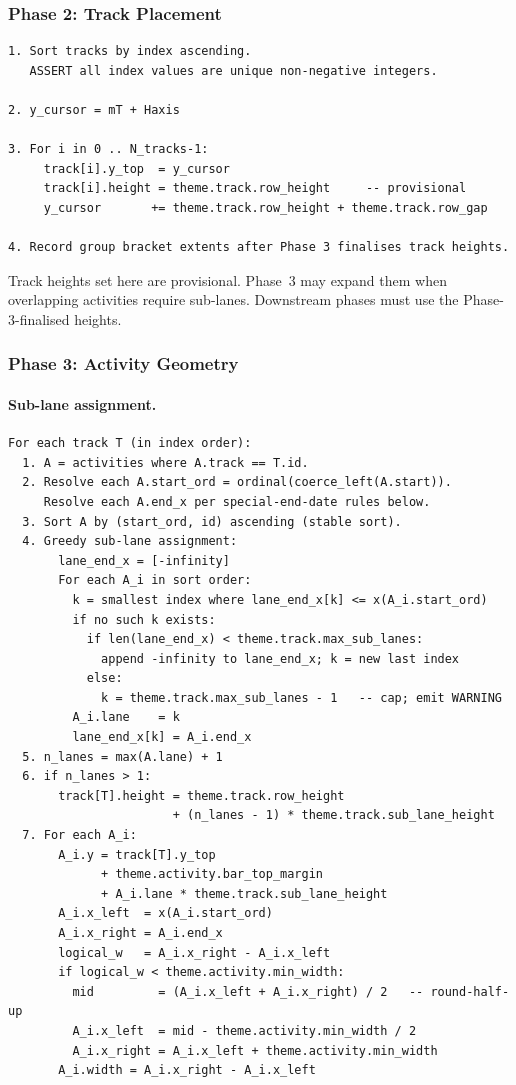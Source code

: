 \subsubsection{Phase 2: Track Placement}
\label{sec:phase2}

\begin{lstlisting}[caption={Phase 2: Track placement}]
1. Sort tracks by index ascending.
   ASSERT all index values are unique non-negative integers.

2. y_cursor = mT + Haxis

3. For i in 0 .. N_tracks-1:
     track[i].y_top  = y_cursor
     track[i].height = theme.track.row_height     -- provisional
     y_cursor       += theme.track.row_height + theme.track.row_gap

4. Record group bracket extents after Phase 3 finalises track heights.
\end{lstlisting}

Track heights set here are provisional. Phase~3 may expand them when overlapping activities
require sub-lanes. Downstream phases must use the Phase-3-finalised heights.

\subsubsection{Phase 3: Activity Geometry}
\label{sec:phase3}

\paragraph{Sub-lane assignment.}

\begin{lstlisting}[caption={Phase 3: Activity geometry and greedy sub-lane assignment}]
For each track T (in index order):
  1. A = activities where A.track == T.id.
  2. Resolve each A.start_ord = ordinal(coerce_left(A.start)).
     Resolve each A.end_x per special-end-date rules below.
  3. Sort A by (start_ord, id) ascending (stable sort).
  4. Greedy sub-lane assignment:
       lane_end_x = [-infinity]
       For each A_i in sort order:
         k = smallest index where lane_end_x[k] <= x(A_i.start_ord)
         if no such k exists:
           if len(lane_end_x) < theme.track.max_sub_lanes:
             append -infinity to lane_end_x; k = new last index
           else:
             k = theme.track.max_sub_lanes - 1   -- cap; emit WARNING
         A_i.lane    = k
         lane_end_x[k] = A_i.end_x
  5. n_lanes = max(A.lane) + 1
  6. if n_lanes > 1:
       track[T].height = theme.track.row_height
                       + (n_lanes - 1) * theme.track.sub_lane_height
  7. For each A_i:
       A_i.y = track[T].y_top
             + theme.activity.bar_top_margin
             + A_i.lane * theme.track.sub_lane_height
       A_i.x_left  = x(A_i.start_ord)
       A_i.x_right = A_i.end_x
       logical_w   = A_i.x_right - A_i.x_left
       if logical_w < theme.activity.min_width:
         mid         = (A_i.x_left + A_i.x_right) / 2   -- round-half-up
         A_i.x_left  = mid - theme.activity.min_width / 2
         A_i.x_right = A_i.x_left + theme.activity.min_width
       A_i.width = A_i.x_right - A_i.x_left
\end{lstlisting}

